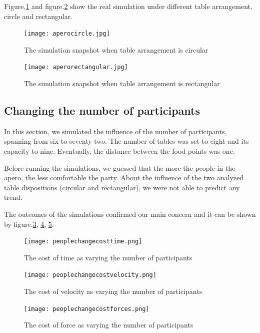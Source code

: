 \documentclass[11pt]{article}
\begin{document}
Figure.\ref{fig:aperocircle} and figure.\ref{fig:aperorectangular} show the real simulation under different table arrangement, circle and rectangular.
\begin{figure}[H]
    \centering
    \texttt{[image: aperocircle.jpg]}
    \caption{The simulation snapshot when table arrangement is circular}
    \label{fig:aperocircle}
\end{figure}

\begin{figure}[H]
    \centering
    \texttt{[image: aperorectangular.jpg]}
    \caption{The simulation snapshot when table arrangement is rectangular}
    \label{fig:aperorectangular}
\end{figure}



\subsection{Changing the number of participants}
In this section, we simulated the influence of the number of participants, spanning from six to seventy-two. The number of tables was set to eight and its capacity to nine. Eventually, the distance between the food points was one.

Before running the simulations, we guessed that the more the people in the apero, the less comfortable the party. About the influence of the two analyzed table dispositions (circular and rectangular), we were not able to predict any trend.

The outcomes of the simulations confirmed our main concern and it can be shown by figure.\ref{fig:peoplecostt}, \ref{fig:peoplecostv}, \ref{fig:peoplecostf}.

\begin{figure}[ht!]
\centering
\texttt{[image: peoplechangecosttime.png]}
\caption{The cost of time as varying the number of participants}
\label{fig:peoplecostt}
\end{figure}

\begin{figure}[ht!]
\centering
\texttt{[image: peoplechangecostvelocity.png]}
\caption{The cost of velocity as varying the number of participants}
\label{fig:peoplecostv}
\end{figure}

\begin{figure}[ht!]
\centering
\texttt{[image: peoplechangecostforces.png]}
\caption{The cost of force as varying the number of participants}
\label{fig:peoplecostf}
\end{figure}
\end{document}
